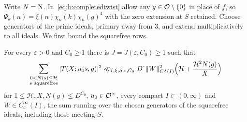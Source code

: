 Write $N=\mathrm{N}$. In~\eqref{eq:b:completedtwist} allow any $g\in\mathcal{O}\setminus\{0\}$ in place of $f$, so $\Psi_k(n)=\xi(n)\chi_n(k)\chi_n(g)^4$ with the zero extension at $S$ retained. Choose generators of the prime ideals, primary away from $3$, and extend multiplicatively to all ideals. We first bound the squarefree rows.

\begin{lemma}\label{lem:b:squarefreecompleted}
For every $\varepsilon>0$ and $C_0\ge1$ there is $J=J(\varepsilon,C_0)\ge1$ such that
\begin{equation}\label{eq:b:squarefreecompleted}
  \sum_{\substack{0<N(s)\le\mathcal H\\s\ {\rm squarefree}}}|T(X;u_0s,g)|^2\ll_{I,\xi,S,\varepsilon,C_0}D^\varepsilon\|W\|^2_{C^J(I)}\Bigl(\mathcal H+\frac{\mathcal H^2N(g)}X\Bigr)
\end{equation}
for $1\le\mathcal H,X,N(g)\le D^{C_0}$, $u_0\in\mathcal{O}^\times$, every compact $I\subset(0,\infty)$ and $W\in C_c^\infty(I)$, the sum running over the chosen generators of the squarefree ideals, including those meeting $S$.
\end{lemma}

